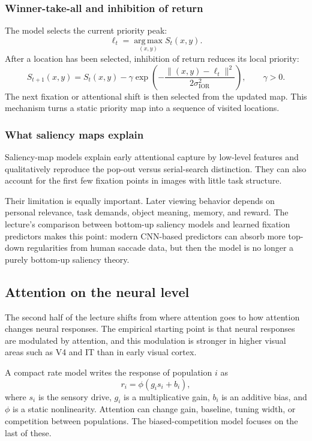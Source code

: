 \clearpage

\subsubsection{Winner-take-all and inhibition of return}

The model selects the current priority peak:
\[
\ell_t = \operatorname*{arg\,max}_{(x,y)} S_t(x,y).
\]
After a location has been selected, inhibition of return reduces its local priority:
\[
S_{t+1}(x,y)
=
S_t(x,y)
-
\gamma
\exp\left(
-\frac{\|(x,y)-\ell_t\|^2}{2\sigma_{\mathrm{IOR}}^2}
\right),
\qquad
\gamma>0 .
\]
The next fixation or attentional shift is then selected from the updated map. This mechanism turns a static priority map into a sequence of visited locations.

\subsubsection{What saliency maps explain}

Saliency-map models explain early attentional capture by low-level features and qualitatively reproduce the pop-out versus serial-search distinction. They can also account for the first few fixation points in images with little task structure.

Their limitation is equally important. Later viewing behavior depends on personal relevance, task demands, object meaning, memory, and reward. The lecture's comparison between bottom-up saliency models and learned fixation predictors makes this point: modern CNN-based predictors can absorb more top-down regularities from human saccade data, but then the model is no longer a purely bottom-up saliency theory.

\subsection{Attention on the neural level}

The second half of the lecture shifts from where attention goes to how attention changes neural responses. The empirical starting point is that neural responses are modulated by attention, and this modulation is stronger in higher visual areas such as V4 and IT than in early visual cortex.

A compact rate model writes the response of population \(i\) as
\[
r_i = \phi(g_i s_i + b_i),
\]
where \(s_i\) is the sensory drive, \(g_i\) is a multiplicative gain, \(b_i\) is an additive bias, and \(\phi\) is a static nonlinearity. Attention can change gain, baseline, tuning width, or competition between populations. The biased-competition model focuses on the last of these.

